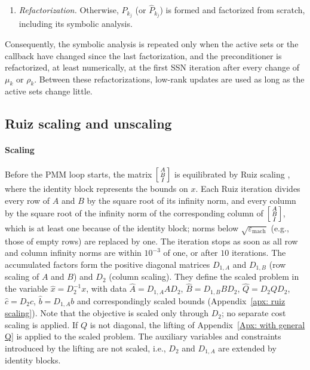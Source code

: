 \begin{enumerate}
    \item \emph{Refactorization.} Otherwise, $P_{k_j}$ (or $\widehat{P}_{k_j}$) is formed and factorized from scratch, including its symbolic analysis.
\end{enumerate}
Consequently, the symbolic analysis is repeated only when the active sets or the callback have changed since the last factorization, and the preconditioner is refactorized, at least numerically, at the first SSN iteration after every change of $\mu_k$ or $\rho_k$. Between these refactorizations, low-rank updates are used as long as the active sets change little.


\subsection{Ruiz scaling and unscaling} \label{subsec: scaling implementation}

\paragraph{Scaling} Before the PMM loop starts, the matrix $\begin{bsmallmatrix} A \\ B \\ I \end{bsmallmatrix}$ is equilibrated by Ruiz scaling \cite[Algorithm 2.1]{Ruiz2001Scaling}, where the identity block represents the bounds on $x$. Each Ruiz iteration divides every row of $A$ and $B$ by the square root of its infinity norm, and every column by the square root of the infinity norm of the corresponding column of $\begin{bsmallmatrix} A \\ B \\ I \end{bsmallmatrix}$, which is at least one because of the identity block; norms below $\sqrt{\varepsilon_{\mathrm{mach}}}$ (e.g., those of empty rows) are replaced by one. The iteration stops as soon as all row and column infinity norms are within $10^{-3}$ of one, or after $10$ iterations. The accumulated factors form the positive diagonal matrices $D_{1,A}$ and $D_{1,B}$ (row scaling of $A$ and $B$) and $D_2$ (column scaling). They define the scaled problem in the variable $\hat{x} = D_2^{-1}x$, with data $\hat{A} = D_{1,A} A D_2$, $\hat{B} = D_{1,B} B D_2$, $\hat{Q} = D_2 Q D_2$, $\hat{c} = D_2 c$, $\hat{b} = D_{1,A} b$ and correspondingly scaled bounds (Appendix~\ref{apx: ruiz scaling}). Note that the objective is scaled only through $D_2$; no separate cost scaling is applied. If $Q$ is not diagonal, the lifting of Appendix~\ref{Apx: with general Q} is applied to the scaled problem. The auxiliary variables and constraints introduced by the lifting are not scaled, i.e., $D_2$ and $D_{1,A}$ are extended by identity blocks.

